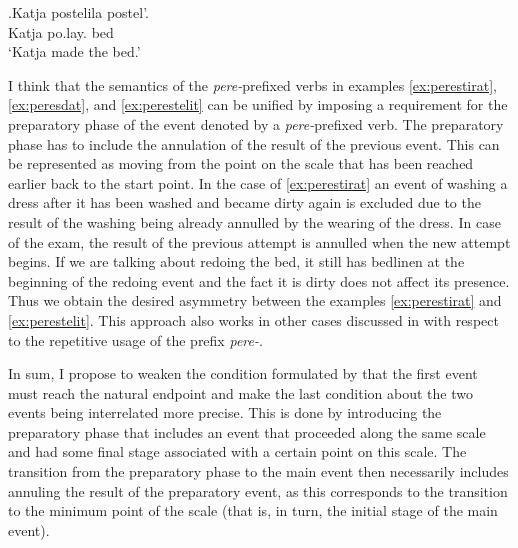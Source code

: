 \exg.\label{ex:postelit}Katja postelila postel'.\\
Katja po.lay. bed\\
\trans `Katja made the bed.'

I think that the semantics of the \textit{pere-}prefixed verbs in examples \ref{ex:perestirat}, \ref{ex:peresdat}, and \ref{ex:perestelit} can be unified by imposing a requirement for the preparatory phase of the event denoted by a \textit{pere-}prefixed verb. The preparatory phase has to include the annulation of the result of the previous event. This can be represented as moving from the point on the scale that has been reached earlier back to the start point. In the case of \ref{ex:perestirat} an event of washing a dress after it has been washed and became dirty again is excluded due to the result of the washing being already annulled by the wearing of the dress. In case of the exam, the result of the previous attempt is annulled when the new attempt begins. If we are talking about redoing the bed, it still has bedlinen at the beginning of the redoing event and the fact it is dirty does not affect its presence. Thus we obtain the desired asymmetry between the examples \ref{ex:perestirat} and \ref{ex:perestelit}. This approach also works in other cases discussed in \citealt{Kagan:book} with respect to the repetitive usage of the prefix \textit{pere-}.

In sum, I propose to weaken the condition formulated by \citet{Kagan:book} that the first event must reach the natural endpoint and make the last condition about the two events being interrelated more precise. This is done by introducing the preparatory phase that includes an event that proceeded along the same scale and had some final stage associated with a certain point on this scale. The transition from the preparatory phase to the main event then necessarily includes annuling the result of the preparatory event, as this corresponds to the transition to the minimum point of the scale (that is, in turn, the initial stage of the main event).

